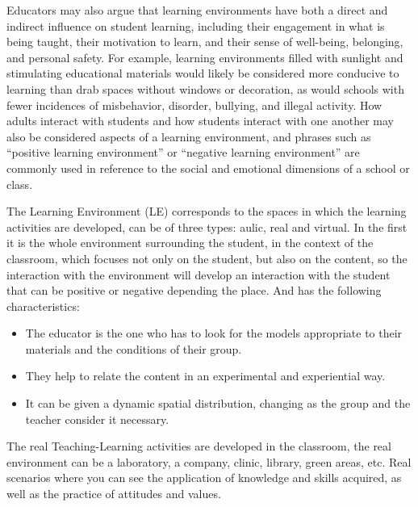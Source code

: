 Educators may also argue that learning environments have both a direct and indirect influence on student learning, including their engagement in what is being taught, their motivation to learn, and their sense of well-being, belonging, and personal safety. For example, learning environments filled with sunlight and stimulating educational materials would likely be considered more conducive to learning than drab spaces without windows or decoration, as would schools with fewer incidences of misbehavior, disorder, bullying, and illegal activity. How adults interact with students and how students interact with one another may also be considered aspects of a learning environment, and phrases such as “positive learning environment” or “negative learning environment” are commonly used in reference to the social and emotional dimensions of a school or class.

The Learning Environment (LE) corresponds to the spaces in which the learning activities are developed, can be of three types: aulic, real and virtual. In the first it is the whole environment surrounding the student, in the context of the classroom, which focuses not only on the student, but also on the content, so the interaction with the environment will develop an interaction with the student that can be positive or negative depending the place. And has the following characteristics: 
\begin{itemize}
 \item The educator is the one who has to look for the models appropriate to their materials and the conditions of their group.
 \item They help to relate the content in an experimental and experiential way.
 \item It can be given a dynamic spatial distribution, changing as the group and the teacher consider it necessary.
\end{itemize}

The real Teaching-Learning activities are developed in the classroom, the real environment can be a laboratory, a company, clinic, library, green areas, etc. Real scenarios where you can see the application of knowledge and skills acquired, as well as the practice of attitudes and values. 

